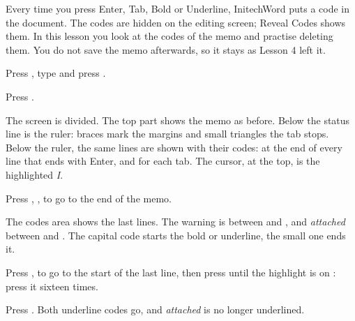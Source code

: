 Every time you press Enter, Tab, Bold or Underline, InitechWord puts a code
in the document.  The codes are hidden on the editing screen; Reveal Codes
shows them.  In this lesson you look at the codes of the memo and practise
deleting them.  You do not save the memo afterwards, so it stays as Lesson 4
left it.

\begin{WPSteps}
\item Press , type  and press
.
\item Press .
\end{WPSteps}
The screen is divided.  The top part shows the memo as before.  Below the
status line is the ruler: braces mark the margins and small triangles the tab
stops.  Below the ruler, the same lines are shown with their codes:
\Code{[HRt]} at the end of every line that ends with Enter, and \Code{[Tab]}
for each tab.  The cursor, at the top, is the highlighted \textit{I}.

\begin{WPSteps}
\item Press , ,  to go to the end
of the memo.
\end{WPSteps}
The codes area shows the last lines.  The warning is between
\Code{[BOLD]} and \Code{[bold]}, and \textit{attached} between \Code{[UND]}
and \Code{[und]}.  The capital code starts the bold or underline, the small
one ends it.

\begin{WPSteps}
\item Press ,  to go to the start of the last
line, then press  until the highlight is on \Code{[UND]}:
press it sixteen times.
\item Press .  Both underline codes go, and \textit{attached}
is no longer underlined.
\end{WPSteps}

